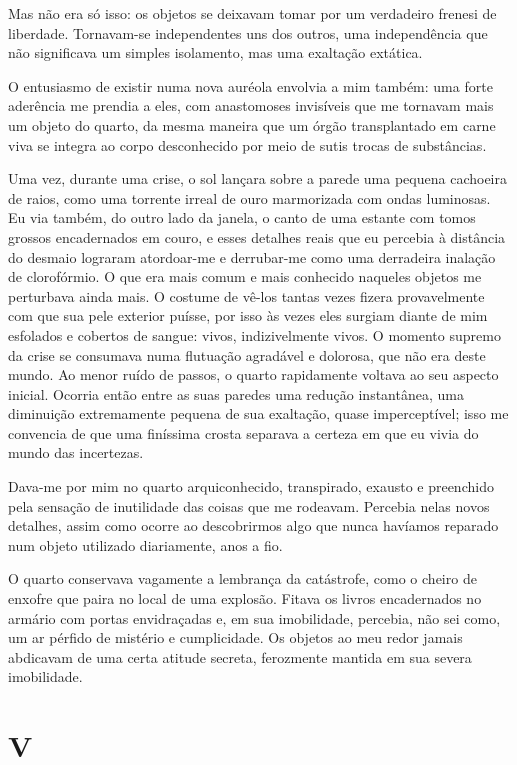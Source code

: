 Mas não era só isso: os objetos se deixavam tomar por um verdadeiro frenesi de liberdade. Tornavam-se independentes uns dos outros, uma independência que não significava um simples isolamento, mas uma exaltação extática.

O entusiasmo de existir numa nova auréola envolvia a mim também: uma forte aderência me prendia a eles, com anastomoses invisíveis que me tornavam mais um objeto do quarto, da mesma maneira que um órgão transplantado em carne viva se integra ao corpo desconhecido por meio de sutis trocas de substâncias.

Uma vez, durante uma crise, o sol lançara sobre a parede uma pequena cachoeira de raios, como uma torrente irreal de ouro marmorizada com ondas luminosas. Eu via também, do outro lado da janela, o canto de uma estante com tomos grossos encadernados em couro, e esses detalhes reais que eu percebia à distância do desmaio lograram atordoar-me e derrubar-me como uma derradeira inalação de clorofórmio. O que era mais comum e mais conhecido naqueles objetos me perturbava ainda mais. O costume de vê-los tantas vezes fizera provavelmente com que sua pele exterior puísse, por isso às vezes eles surgiam diante de mim esfolados e cobertos de sangue: vivos, indizivelmente vivos.
O momento supremo da crise se consumava numa flutuação agradável e dolorosa, que não era deste mundo. Ao menor ruído de passos, o quarto rapidamente voltava ao seu aspecto inicial. Ocorria então entre as suas paredes uma redução instantânea, uma diminuição extremamente pequena de sua exaltação, quase imperceptível; isso me convencia de que uma finíssima crosta separava a certeza em que eu vivia do mundo das incertezas.

Dava-me por mim no quarto arquiconhecido, transpirado, exausto e preenchido pela sensação de inutilidade das coisas que me rodeavam. Percebia nelas novos detalhes, assim como ocorre ao descobrirmos algo que nunca havíamos reparado num objeto utilizado diariamente, anos a fio.

O quarto conservava vagamente a lembrança da catástrofe, como o cheiro de enxofre que paira no local de uma explosão. Fitava os livros encadernados no armário com portas envidraçadas e, em sua imobilidade, percebia, não sei como, um ar pérfido de mistério e cumplicidade. Os objetos ao meu redor jamais abdicavam de uma certa atitude secreta, ferozmente mantida em sua severa imobilidade.


\chapter*{\centering\Large{V}}

